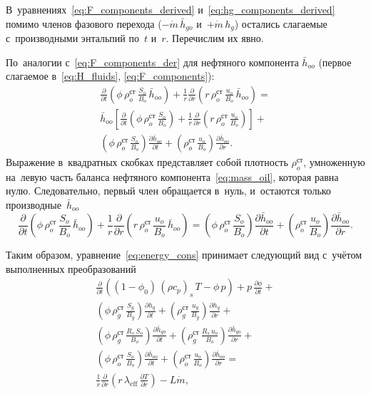 \documentclass[12pt,a4paper]{article}
\newcommand{\divr}[1]{\frac{1}{r}\frac{\partial}{\partial r}\!\left(r\,#1\right)}
\newcommand{\pdt}[1]{\frac{\partial #1}{\partial t}}
\newcommand{\pdr}[1]{\frac{\partial #1}{\partial r}}
\newcommand{\mdot}{\dot{m}}
\newcommand{\leff}{\lambda_{\mathrm{eff}}}
\begin{document}
В~уравнениях~\eqref{eq:F_components_derived}
и~\eqref{eq:hg_components_derived} помимо членов фазового перехода
($-\mdot\,\bar{h}_{go}$ и~$+\mdot\,h_g$) остались слагаемые
с~производными энтальпий по~$t$ и~$r$. Перечислим их явно.

По~аналогии с~\eqref{eq:F_components_der} для нефтяного компонента $\bar{h}_{oo}$
(первое слагаемое в~\eqref{eq:H_fluids}, \eqref{eq:F_components}):
\begin{multline}\label{eq:hoo_terms}
  \pdt{}\!\left(\phi\,\rho_o^{\text{ст}}\,
    \frac{S_o}{B_o}\,\bar{h}_{oo}\right)
  + \divr{\rho_o^{\text{ст}}\,
    \frac{u_o}{B_o}\,\bar{h}_{oo}} =
    \\
    \bar{h}_{oo}\!\left[
    \pdt{}\!\left(\phi\,\rho_o^{\text{ст}}\,
      \frac{S_o}{B_o}\right)
    + \divr{\rho_o^{\text{ст}}\,\frac{u_o}{B_o}}
  \right]
  +
  \\
    \left(\phi\,\rho_o^{\text{ст}}\,
      \frac{S_o}{B_o}\right)
    \pdt{\bar{h}_{oo}}\!
    + \left(\rho_o^{\text{ст}}\,
      \frac{u_o}{B_o}\right)\pdr{\bar{h}_{oo}}.
\end{multline}
Выражение в~квадратных скобках представляет собой плотность $\rho_o^{\text{ст}}$,
умноженную на~левую
часть баланса нефтяного компонента~\eqref{eq:mass_oil}, которая
равна нулю. Следовательно, первый член обращается в~нуль, и~остаются
только производные~$\bar{h}_{oo}$
\begin{equation}\label{eq:hoo_remainder}
    \pdt{}\!\left(\phi\,\rho_o^{\text{ст}}\,
    \frac{S_o}{B_o}\,\bar{h}_{oo}\right)
  + \divr{\rho_o^{\text{ст}}\,
    \frac{u_o}{B_o}\,\bar{h}_{oo}} =\left(\phi\,\rho_o^{\text{ст}}\,
      \frac{S_o}{B_o}\right)
    \pdt{\bar{h}_{oo}}\!
    + \left(\rho_o^{\text{ст}}\,
      \frac{u_o}{B_o}\right)\pdr{\bar{h}_{oo}}.
\end{equation}

Таким образом, уравнение~\eqref{eq:energy_cons} принимает следующий вид
с~учётом выполненных преобразований
\begin{multline}\label{eq:energy_cons_der}
  \pdt{}\left( (1 - \phi_0)\,(\rho c_p)_s\,T - \phi\,p\right) + p\,\pdt{\phi}
      +
      \\
    \left(\phi\,\rho_g^{\text{ст}}\,
      \frac{S_g}{B_g}\right)
    \pdt{h_g}\!
    + \left(\rho_g^{\text{ст}}\,
      \frac{u_g}{B_g}\right)\pdr{h_g}  +
      \\
    \left(\phi\,\rho_g^{\text{ст}}\,
      \frac{R_s\,S_o}{B_o}\right)
    \pdt{\bar{h}_{go}}\!
    + \left(\rho_g^{\text{ст}}\,
      \frac{R_s\,u_o}{B_o}\right)\pdr{\bar{h}_{go} } +
      \\
  \left(\phi\,\rho_o^{\text{ст}}\,
      \frac{S_o}{B_o}\right)
    \pdt{\bar{h}_{oo}}\!
    + \left(\rho_o^{\text{ст}}\,
      \frac{u_o}{B_o}\right)\pdr{\bar{h}_{oo}} =
  \\
  \divr{\leff\,\pdr{T}} - L\mdot,
\end{multline}
\end{document}
